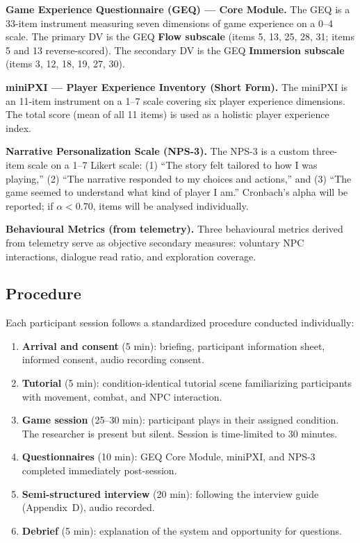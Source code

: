 \documentclass[12pt,a4paper]{report}
\begin{document}
\textbf{Game Experience Questionnaire (GEQ) --- Core Module.} The GEQ \citep{ijsselsteijn2013geq} is a 33-item instrument measuring seven dimensions of game experience on a 0--4 scale. The primary DV is the GEQ \textbf{Flow subscale} (items 5, 13, 25, 28, 31; items 5 and 13 reverse-scored). The secondary DV is the GEQ \textbf{Immersion subscale} (items 3, 12, 18, 19, 27, 30).

\textbf{miniPXI --- Player Experience Inventory (Short Form).} The miniPXI \citep{vornhagen2022minipxi} is an 11-item instrument on a 1--7 scale covering six player experience dimensions. The total score (mean of all 11 items) is used as a holistic player experience index.

\textbf{Narrative Personalization Scale (NPS-3).} The NPS-3 is a custom three-item scale on a 1--7 Likert scale: (1) ``The story felt tailored to how I was playing,'' (2) ``The narrative responded to my choices and actions,'' and (3) ``The game seemed to understand what kind of player I am.'' Cronbach's alpha will be reported; if $\alpha < 0.70$, items will be analysed individually.

\textbf{Behavioural Metrics (from telemetry).} Three behavioural metrics derived from telemetry serve as objective secondary measures: voluntary NPC interactions, dialogue read ratio, and exploration coverage.

\subsection{Procedure}

Each participant session follows a standardized procedure conducted individually:

\begin{enumerate}
\item \textbf{Arrival and consent} (5 min): briefing, participant information sheet, informed consent, audio recording consent.
\item \textbf{Tutorial} (5 min): condition-identical tutorial scene familiarizing participants with movement, combat, and NPC interaction.
\item \textbf{Game session} (25--30 min): participant plays in their assigned condition. The researcher is present but silent. Session is time-limited to 30 minutes.
\item \textbf{Questionnaires} (10 min): GEQ Core Module, miniPXI, and NPS-3 completed immediately post-session.
\item \textbf{Semi-structured interview} (20 min): following the interview guide (Appendix~D), audio recorded.
\item \textbf{Debrief} (5 min): explanation of the system and opportunity for questions.
\end{enumerate}
\end{document}
